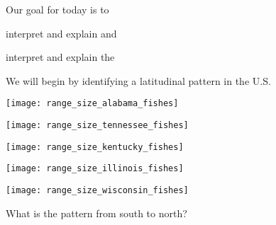 \documentclass[t]{beamer}
\begin{document}
%

\begin{frame}[t]{Our goal for today is to }

	
	\hangpara interpret and explain  and
	
	\hangpara interpret and explain the 
	
	
	\hangpara We will begin by identifying a latitudinal pattern in the U.S.

\end{frame}

%
\begin{frame}[t,plain]
	\begin{center}
		\texttt{[image: range\_size\_alabama\_fishes]}
	\end{center}
\end{frame}
%
\begin{frame}[t,plain]
	\begin{center}
		\texttt{[image: range\_size\_tennessee\_fishes]}
	\end{center}
\end{frame}
%
\begin{frame}[t,plain]
	\begin{center}
		\texttt{[image: range\_size\_kentucky\_fishes]}
	\end{center}
\end{frame}
%
\begin{frame}[t,plain]
	\begin{center}
		\texttt{[image: range\_size\_illinois\_fishes]}
	\end{center}
\end{frame}
%
\begin{frame}[t,plain]
	\begin{center}
		\texttt{[image: range\_size\_wisconsin\_fishes]}
	\end{center}
\end{frame}
%
{
\begin{frame}[b]{What is the pattern from south to north?}

\end{frame}
}
\end{document}
